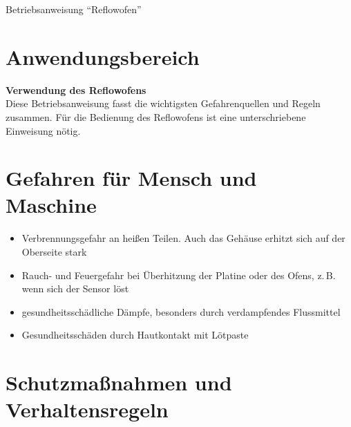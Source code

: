 \documentclass[fontsize=11pt]{scrartcl}
\begin{document}

\begin{center}
	\LARGE{Betriebsanweisung \enquote{Reflowofen}}
\end{center}


\section{Anwendungsbereich}

\begin{center}
\textbf{Verwendung des Reflowofens}\\
	Diese Betriebsanweisung fasst die wichtigsten Gefahrenquellen und Regeln zusammen. 	Für die Bedienung des Reflowofens ist eine unterschriebene Einweisung nötig.
\end{center}



\section{Gefahren für Mensch und Maschine}

\begin{itemize}
	\item Verbrennungsgefahr an heißen Teilen. Auch das Gehäuse erhitzt sich auf der Oberseite stark
	\item Rauch- und Feuergefahr bei Überhitzung der Platine oder des Ofens, z.\,B. wenn sich der Sensor löst
	\item gesundheitsschädliche Dämpfe, besonders durch verdampfendes Flussmittel
	\item Gesundheitsschäden durch Hautkontakt mit Lötpaste
\end{itemize}

\section{Schutzmaßnahmen und Verhaltensregeln}
\end{document}
